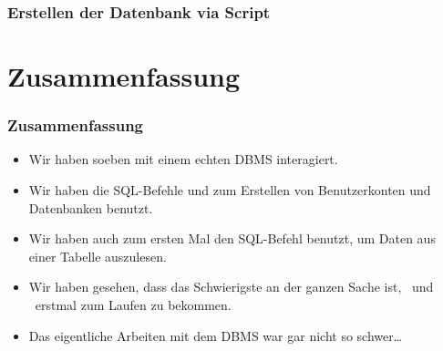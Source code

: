 \documentclass[aspectratio=169,mathserif,notheorems]{beamer}%
\begin{document}
%
\begin{frame}[fragile]
\frametitle{Erstellen der Datenbank via Script}%
\end{frame}
%
\section{Zusammenfassung}%
%
\begin{frame}%
\frametitle{Zusammenfassung}%
\begin{itemize}%
\item Wir haben soeben mit einem echten DBMS interagiert.%
\item<2-> Wir haben die SQL-Befehle  und  zum Erstellen von Benutzerkonten und Datenbanken benutzt.%
\item<3-> Wir haben auch zum ersten Mal den SQL-Befehl  benutzt, um Daten aus einer Tabelle auszulesen.%
\item<4-> Wir haben gesehen, dass das Schwierigste an der ganzen Sache ist, \postgresql\ und \psql\ erstmal zum Laufen zu bekommen.%
\item<5-> Das eigentliche Arbeiten mit dem DBMS war gar nicht so schwer\dots%
\end{itemize}%
\end{frame}%
%
\endPresentation%
\end{document}

